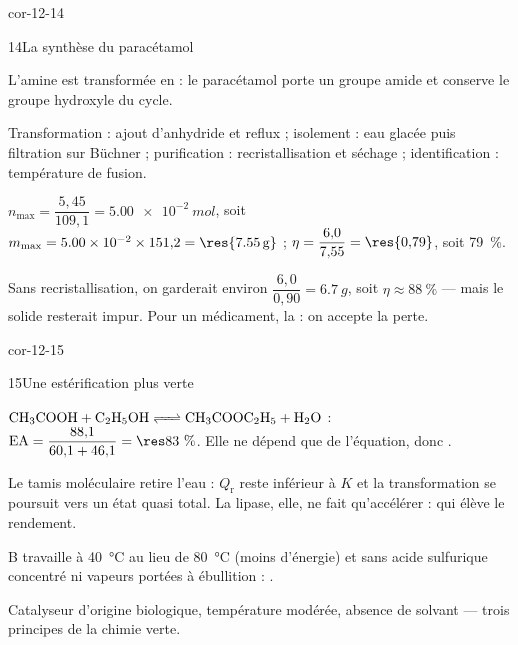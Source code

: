 \begin{blocLivre}{cor-12-14}
\begin{corrige}{14}{La synthèse du paracétamol}
\begin{questions}
\item L'amine est transformée en  : le paracétamol porte un groupe amide et conserve le groupe
hydroxyle du cycle.
\item Transformation : ajout d'anhydride et reflux ; isolement : eau glacée puis filtration sur Büchner ;
purification : recristallisation et séchage ; identification : température de fusion.
\item $n_{\max}=\dfrac{5{,}45}{109{,}1}=\qty{5,00e-2}{mol}$, soit
$m_{\max}=\num{5.00e-2}\times151{,}2=\res{\qty{7,55}{g}}$ ; $\eta=\dfrac{6{,}0}{7{,}55}=\res{0{,}79}$, soit 79~\%.
\item Sans recristallisation, on garderait environ $\dfrac{6{,}0}{0{,}90}=\qty{6,7}{g}$, soit $\eta\approx88~\%$ —
mais le solide resterait impur. Pour un médicament, la  : on accepte la
perte.
\end{questions}
\end{corrige}
\end{blocLivre}
\begin{blocLivre}{cor-12-15}
\begin{corrige}{15}{Une estérification plus verte}
\begin{questions}
\item $\ce{CH3COOH + C2H5OH <=> CH3COOC2H5 + H2O}$ :
$\mathrm{EA}=\dfrac{88{,}1}{60{,}1+46{,}1}=\res{83~\%}$. Elle ne dépend que de l'équation, donc
.
\item Le tamis moléculaire retire l'eau : $Q_\mathrm{r}$ reste inférieur à $K$ et la transformation se poursuit vers
un état quasi total. La lipase, elle, ne fait qu'accélérer :  qui élève le
rendement.
\item B travaille à 40~°C au lieu de 80~°C (moins d'énergie) et sans acide sulfurique concentré ni vapeurs portées à
ébullition : .
\item Catalyseur  d'origine biologique, température modérée, absence de solvant — trois
principes de la chimie verte.
\end{questions}
\end{corrige}
\end{blocLivre}

